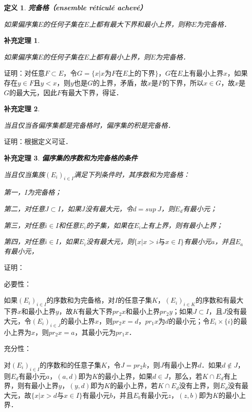 \documentclass[12pt, a4paper, oneside]{book}
\newtheorem{cor}{补充定理}
\newtheorem{de}{定义}
\begin{document}
			\begin{de}
				\textbf{完备格（ensemble réticulé achevé）}
				\par
				如果偏序集$E$的任何子集在$E$上都有最大下界和最小上界，则称$E$为完备格．
			\end{de}
			
			\begin{cor}\label{cor194}
				\hfill\par
				如果偏序集$E$的任何子集在$E$上都有最小上界，则$E$为完备格．
			\end{cor}
			证明：对任意$F\subset E$，令$G=\{x|x\text{为}F\text{在}E\text{上的下界}\}$，$G$在$E$上有最小上界$x$，如果存在$y\in F$且$y<x$，则$y$也是$G$的上界，矛盾，故$x$是$F$的下界，所以$x\in G$，故$x$是$G$的最大元，因此$F$有最大下界，得证．
			
			\begin{cor}\label{cor195}
				\hfill\par
				当且仅当各偏序集都是完备格时，偏序集的积是完备格．
			\end{cor}
			证明：根据定义可证．
			
			\begin{cor}\label{cor196}
				\textbf{偏序集的序数和为完备格的条件}
				\par
				当且仅当集族$(E_i)_{i\in I}$满足下列条件时，其序数和为完备格：
				\par
				第一，$I$为完备格；
				\par
				第二，对任意$J\subset I$，如果$J$没有最大元，令$d=sup\ J$，则$E_d$有最小元；
				\par
				第三，对任意$i\in I$和任意$E_i$的子集，如果在$E_i$上有上界，则有最小上界；
				\par
				第四，对任意$i\in I$，如果$E_i$没有最大元，则$\{x|x>i\text{与}x\in I\}$有最小元$a$，并且$E_a$有最小元，
			\end{cor}
			证明： 
			\par
			必要性：
			\par
			如果$(E_i)_{i\in I}$的序数和为完备格，对$I$的任意子集$K$，$(E_i)_{i\in K}$的序数和有最大下界$x$和最小上界$y$，故$K$有最大下界$pr_2x$和最小上界$pr_2y$；如果$J\subset I$，且$J$没有最大元，令$(E_i)_{i\in J}$的最小上界$x$，则$pr_2x=d$，$pr_1x$为$d$的最小元；令$E_i\times \{i\}$的最小上界为$x$，则$pr_2x=a$，其最小元为$pr_1x$．
			\par
			充分性：
			\par
			对$(E_i)_{i\in I}$的序数和的任意子集$K$，令$J=pr_2k$，则$J$有最小上界$d$．如果$d\notin J$，则$E_d$有最小元$a$，$(a, d)$即为$K$的最小上界，如果$d\in J$，那么，若$K\cap E_d$有上界，则有最小上界$y$，$(y, d)$即为$K$的最小上界，若$K\cap E_d$没有上界，则$E_d$没有最大元，故$\{x|x>d\text{与}x\in I\}$有最小元$b$，并且$E_b$有最小元$z$，$(z, b)$即为$K$的最小上界．
			
\end{document}
